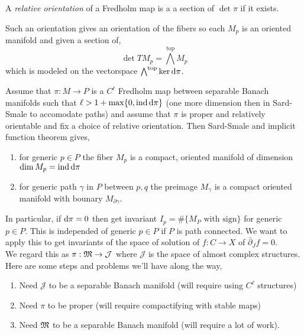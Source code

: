 \documentclass[12pt]{article}
\newcommand{\dbar}{\bar{\partial}}
\DeclareMathOperator{\ind}{\mathrm{ind}}
\begin{document}
\begin{defn}
A \textit{relative orientation} of a Fredholm map is a a section of $\det{\pi}$ if it exists.
\end{defn}

\begin{rmk}
Such an orientation gives an orientation of the fibers so each $M_p$ is an oriented manifold and given a section of,
\[ \det{TM_p} = \bigwedge^{\mathrm{top}} M_p \]
which is modeled on the vectorspace $\bigwedge^{\mathrm{top}} \ker{\mathrm{d}{\pi}}$. 
\end{rmk}

\begin{cor}
Assume that $\pi : M \to P$ is a $C^\ell$ Fredholm map between separable Banach manifolds such that $\ell > 1 + \max \{ 0, \ind{\d{\pi}} \}$ (one more dimension then in Sard-Smale to accomodate paths) and assume that $\pi$ is proper and relatively orientable and fix a choice of relative orientation. Then Sard-Smale and implicit function theorem gives,
\begin{enumerate}
\item for generic $p \in P$ the fiber $M_p$ is a compact, oriented manifold of dimension $\dim{M_p} = \ind{\d{\pi}}$
\item for generic path $\gamma$ in $P$ between $p, q$ the preimage $M_\gamma$ is a compact oriented manifold with bounary $M_{\partial \gamma}$. 
\end{enumerate}
\end{cor}

\newcommand{\cJ}{\mathcal{J}}

In particular, if $\mathrm{d}{\pi} = 0$ then get invariant $I_p = \# \{ M_P \text{ with sign} \}$ for generic $p \in P$. This is independed of generic $p \in P$ if $P$ is path connected. We want to apply this to get invariants of the space of solution of $f : C \to X$ of $\dbar_J f = 0$. 
\bigskip\\
We regard this as $\pi : \mf{M} \to \cJ$ where $\cJ$ is the space of almost complex structures. Here are some steps and problems we'll have along the way,
\begin{enumerate}
\item Need $\cJ$ to be a separable Banach manifold (will require using $C^\ell$ structures)
\item Need $\pi$ to be proper (will require compactifying with stable maps)
\item Need $\mathfrak{M}$ to be a separable Banach manifold (will require a lot of work). 
\end{enumerate}
\end{document}
